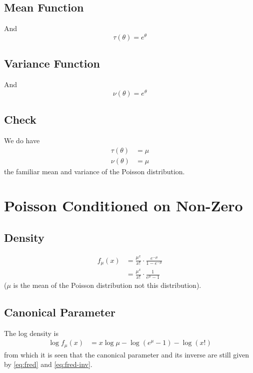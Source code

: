 \subsection{Mean Function}

And
$$
   \tau(\theta) = e^\theta
$$

\subsection{Variance Function}

And
$$
   \nu(\theta) = e^\theta
$$

\subsection{Check}

We do have
\begin{align*}
   \tau(\theta) & = \mu
   \\
   \nu(\theta) & = \mu
\end{align*}
the familiar mean and variance of the Poisson distribution.

\section{Poisson Conditioned on Non-Zero}

\subsection{Density}

\begin{align*}
   f_\mu(x)
   & =
   \frac{\mu^x}{x !} \cdot \frac{e^{- \mu}}{1 - e^{- \mu}}
   \\
   & =
   \frac{\mu^x}{x !} \cdot \frac{1}{e^\mu - 1}
\end{align*}
($\mu$ is the mean of the Poisson distribution not this distribution).

\subsection{Canonical Parameter}

The log density is
\begin{align*}
   \log f_\mu(x)
   & =
   x \log \mu - \log \left( e^\mu - 1 \right) - \log (x !)
\end{align*}
from which it is seen that the canonical parameter and its
inverse are still given by \eqref{eq:fred} and \eqref{eq:fred-inv}.

